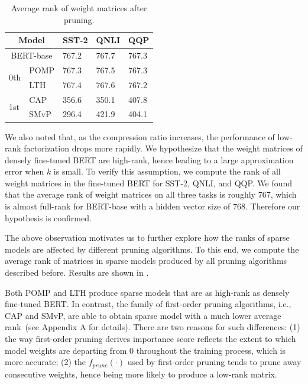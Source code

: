 \begin{table}[th]
	\centering
	\scriptsize
	\begin{tabular}{|l|l|lll|}
\hline
		\multicolumn{2}{|c|}{Model}                          & SST-2       & QNLI          & QQP           \\
\hline
		\multicolumn{2}{|c|}{BERT-base}                           & 767.2        & 767.7          & 767.3          \\
		\hline
		\multirow{2}{*}{0th}                      & POMP & 767.3 & 767.5 & 767.3 \\
		& LTH  & 767.4 & 767.6   & 767.2  \\
\hline
		\multirow{2}{*}{1st} & CAP  & 356.6 & 350.1  & 407.8  \\
		& SMvP & 296.4& 421.9  & 404.1  \\
\hline
	\end{tabular}
	\caption{Average rank of weight matrices after pruning.}
	\label{table:rank}
\end{table}
We also noted that, as the compression ratio increases, the performance of low-rank factorization drops more rapidly. 
We hypothesize that the weight matrices of densely fine-tuned BERT are high-rank, 
hence leading to a large approximation error when $k$ is small. 
To verify this assumption, we compute the rank of all weight matrices in the 
fine-tuned BERT for SST-2, QNLI, and QQP. We found that the average rank of weight matrices 
on all three tasks is roughly 767, which is almost full-rank 
for BERT-base with a hidden vector size of 768. Therefore our hypothesis is confirmed.

The above observation motivates us to further explore how the ranks of 
sparse models are affected by different pruning algorithms. 
To this end, we compute the average rank of matrices in sparse models 
produced by all pruning algorithms described before. 
Results are shown in .

Both POMP and LTH produce sparse models that are 
as high-rank as densely fine-tuned BERT. In contrast, the family of first-order pruning algorithms, 
i.e., CAP and SMvP, are able to obtain sparse model with a much lower average rank~(see Appendix A for details). 
There are two reasons for such differences: 
(1) the way first-order pruning derives importance score reflects the 
extent to which model weights are departing from 0 throughout the 
training process, which is more accurate; 
(2) the $f_{prune}(\cdot)$ used by first-order pruning tends 
to prune away consecutive weights, hence being more likely to produce 
a low-rank matrix.


